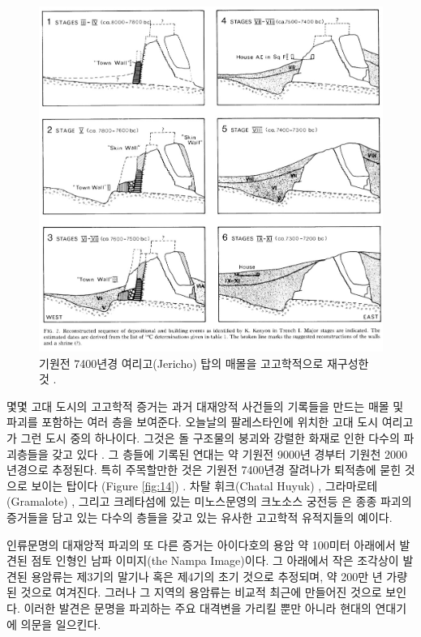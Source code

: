 \documentclass[10pt,twocolumn,letterpaper]{article}
\begin{document}
\begin{figure}[t]
\begin{center}
   \includegraphics[width=1\linewidth]{jericho.jpg}
\end{center}
   \caption{기원전 7400년경 여리고(Jericho) 탑의 매몰을 고고학적으로 재구성한 것 \cite{95}.}
\label{fig:14}
\label{fig:onecol}
\end{figure}

몇몇 고대 도시의 고고학적 증거는 과거 대재앙적 사건들의 기록들을 만드는 매몰 및 파괴를 포함하는 여러 층을 보여준다. 오늘날의  팔레스타인에 위치한 고대 도시 여리고가 그런 도시 중의 하나이다. 그것은 돌 구조물의 붕괴와 강렬한 화재로 인한 다수의 파괴층들을 갖고 있다 \cite{96,97}. 그 층들에 기록된 연대는 약 기원전 9000년 경부터 기원천 2000년경으로 추정된다. 특히 주목할만한 것은 기원전 7400년경 잘려나가 퇴적층에 묻힌 것으로 보이는 탑이다 (Figure \ref{fig:14}) \cite{95}. 차탈 휘크(Chatal Huyuk) \cite{99}, 그라마로테(Gramalote) \cite{98}, 그리고 크레타섬에 있는 미노스문영의 크노소스 궁전등 \cite{100,101}은 종종 파괴의 증거들을 담고 있는 다수의 층들을 갖고 있는 유사한 고고학적 유적지들의 예이다. 

인류문명의 대재앙적 파괴의 또 다른 증거는 아이다호의 용암 약 100미터 아래에서 발견된 점토 인형인 남파 이미지(the Nampa Image)이다\cite{102,103}. 그 아래에서 작은 조각상이 발견된 용암류는 제3기의 말기나 혹은 제4기의 초기 것으로 추정되며, 약 200만 년 가량 된 것으로 여겨진다. 그러나 그 지역의 용암류는 비교적 최근에 만들어진 것으로 보인다. 이러한 발견은 문명을 파괴하는 주요 대격변을 가리킬 뿐만 아니라 현대의 연대기에 의문을 일으킨다.
\end{document}

